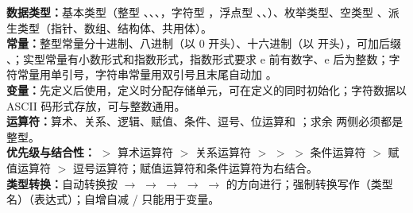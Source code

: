 \documentclass[a4paper,11pt]{article}
\begin{document}

\begin{knowmap}
\textbf{数据类型：}基本类型（整型 、、、，字符型 ，浮点型 、、）、枚举类型、空类型 、派生类型（指针、数组、结构体、共用体）。\\[2pt]
\textbf{常量：}整型常量分十进制、八进制（以 0 开头）、十六进制（以  开头），可加后缀 、；实型常量有小数形式和指数形式，指数形式要求 e 前有数字、e 后为整数；字符常量用单引号，字符串常量用双引号且末尾自动加 。\\[2pt]
\textbf{变量：}先定义后使用，定义时分配存储单元，可在定义的同时初始化；字符数据以 ASCII 码形式存放，可与整数通用。\\[2pt]
\textbf{运算符：}算术、关系、逻辑、赋值、条件、逗号、位运算和 ；求余 \code{\%} 两侧必须都是整型。\\[2pt]
\textbf{优先级与结合性：}\code{!} $>$ 算术运算符 $>$ 关系运算符 $>$ \code{\&\&} $>$ \code{||} $>$ 条件运算符 $>$ 赋值运算符 $>$ 逗号运算符；赋值运算符和条件运算符为右结合。\\[2pt]
\textbf{类型转换：}自动转换按  $\rightarrow$  $\rightarrow$  $\rightarrow$  $\rightarrow$  $\rightarrow$  的方向进行；强制转换写作（类型名）（表达式）；自增自减 \code{++}/\code{--} 只能用于变量。
\end{knowmap}
\end{document}
